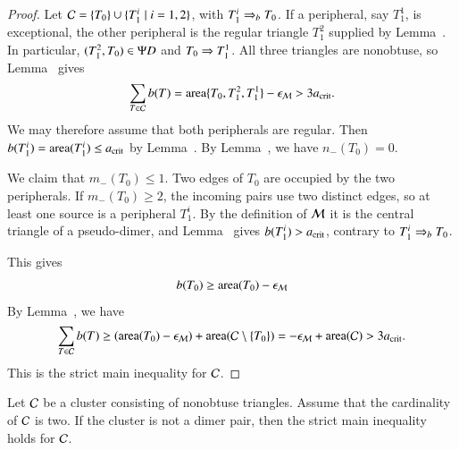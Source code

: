 \begin{proof}  
  Let $\mathcal C = \{T_0\}\cup \{T_1^i \mid i=1,2\}$, with
  $T_1^i\Rightarrow_{b} T_0$. If a peripheral, say $T_1^1$, is exceptional, the other
  peripheral is the regular triangle $T_1^2$ supplied by
  Lemma~. In particular,
  $(T_1^2,T_0)\in\Psi D$ and $T_0\Rightarrow T_1^1$. All three triangles are
  nonobtuse, so Lemma~ gives
  \[
  \sum_{T\in\mathcal C}b(T)
  ={\operatorname{area}}\{T_0,T_1^2,T_1^1\}-\epsilon_{\mathcal M}>3a_\text{crit}.
  \]
  We may therefore assume that both peripherals are regular.
  Then $b(T_1^i)={\operatorname{area}}(T_1^i)\le a_\text{crit}$ by
  Lemma~. By
  Lemma~, we have
  $n_-(T_0)=0$.

  We claim that $m_-(T_0)\le1$.  Two edges of $T_0$ are occupied
  by the two peripherals.  If $m_-(T_0)\ge2$, the incoming pairs
  use two distinct edges, so at least one source is a peripheral
  $T_1^i$.  By the definition of $\mathcal M$ it is the central triangle
  of a pseudo-dimer, and Lemma~ gives
  $b(T_1^i)>a_\text{crit}$, contrary to $T_1^i\Rightarrow_{b} T_0$.

This gives
\[
b(T_0) \ge {\operatorname{area}}(T_0) - \epsilon_{\mathcal M}
\]
By Lemma~, we have
\[
\sum_{T\in\mathcal C} b(T) \ge ({\operatorname{area}}(T_0) - \epsilon_{\mathcal M}) +  {\operatorname{area}}(\mathcal C\setminus \{T_0\}) 
= -\epsilon_{\mathcal M}+ {\operatorname{area}}(\mathcal C) > 3a_\text{crit}.
\]
This is the strict main inequality for $\mathcal C$.
\end{proof}

\begin{lemma} 
  Let $\mathcal C$ be a cluster consisting of nonobtuse triangles.  Assume
  that the cardinality of $\mathcal C$ is two.  If the cluster is not a dimer
  pair, then the strict main inequality holds for $\mathcal C$.
\end{lemma}

